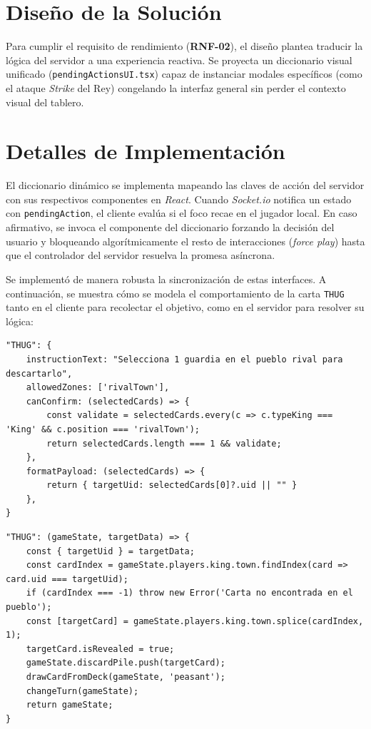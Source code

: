 \section{Diseño de la Solución}
Para cumplir el requisito de rendimiento (\textbf{RNF-02}), el diseño plantea traducir la lógica del servidor a una experiencia reactiva. Se proyecta un diccionario visual unificado (\texttt{pendingActionsUI.tsx}) capaz de instanciar modales específicos (como el ataque \textit{Strike} del Rey) congelando la interfaz general sin perder el contexto visual del tablero.

\section{Detalles de Implementación}
El diccionario dinámico se implementa mapeando las claves de acción del servidor con sus respectivos componentes en \textit{React}. Cuando \textit{Socket.io} notifica un estado con \texttt{pendingAction}, el cliente evalúa si el foco recae en el jugador local. En caso afirmativo, se invoca el componente del diccionario forzando la decisión del usuario y bloqueando algorítmicamente el resto de interacciones (\textit{force play}) hasta que el controlador del servidor resuelva la promesa asíncrona.

Se implementó de manera robusta la sincronización de estas interfaces. A continuación, se muestra cómo se modela el comportamiento de la carta \texttt{THUG} tanto en el cliente para recolectar el objetivo, como en el servidor para resolver su lógica:

\begin{lstlisting}[basicstyle=\scriptsize\ttfamily,caption={Validación de UI para la carta THUG en el Frontend},label={cod:pendingActionsUI1},breaklines=true]
"THUG": {
    instructionText: "Selecciona 1 guardia en el pueblo rival para descartarlo",
    allowedZones: ['rivalTown'],
    canConfirm: (selectedCards) => {
        const validate = selectedCards.every(c => c.typeKing === 'King' && c.position === 'rivalTown');
        return selectedCards.length === 1 && validate;
    }, 
    formatPayload: (selectedCards) => {
        return { targetUid: selectedCards[0]?.uid || "" }
    },
}
\end{lstlisting}

\begin{lstlisting}[basicstyle=\scriptsize\ttfamily,caption={Resolución del efecto de THUG en el Backend},label={cod:rebelPendingActions1},breaklines=true]
"THUG": (gameState, targetData) => {
    const { targetUid } = targetData; 
    const cardIndex = gameState.players.king.town.findIndex(card => card.uid === targetUid);
    if (cardIndex === -1) throw new Error('Carta no encontrada en el pueblo');
    const [targetCard] = gameState.players.king.town.splice(cardIndex, 1);
    targetCard.isRevealed = true;
    gameState.discardPile.push(targetCard);
    drawCardFromDeck(gameState, 'peasant');
    changeTurn(gameState);
    return gameState;
}
\end{lstlisting}

